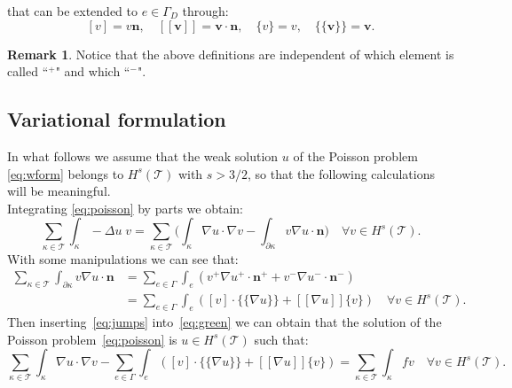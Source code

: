 \documentclass[12pt, a4paper]{article}
\theoremstyle{definition}
\theoremstyle{plain}
\theoremstyle{plain}
\theoremstyle{definition}
\newtheorem*{remark}{Remark}
\begin{document}
that can be extended to $e \in \Gamma_D$ through:
\begin{equation} \label{eq:jupsandaverdir}
	[v] = v \mathbf{n},
	\quad [\![ \mathbf{v} ]\!] = \mathbf{v} \cdot \mathbf{n},
	\quad \{v\} = v,
	\quad \{\!\!\{ \mathbf{v} \}\!\!\} = \mathbf{v}.
\end{equation}
\begin{remark}
	Notice that the above definitions are independent of which element is 
	called ``$^+$" and which ``$^-$".
\end{remark}
\subsection{Variational formulation}
In what follows we assume that the weak solution $u$ of the Poisson problem~ \eqref{eq:wform} belongs to $H^s(\mathcal{T})$ with $s > 3/2$, so that the following calculations will be meaningful.\\
Integrating \eqref{eq:poisson} by parts we obtain:
\begin{equation} \label{eq:green}
	\sum_{\kappa \in \mathcal{T}} \int_\kappa -\Delta u \; v
	= \sum_{\kappa \in \mathcal{T}} \bigg( \int_\kappa \nabla u \cdot \nabla v
	- \int_{\partial \kappa} v \nabla u \cdot \mathbf{n} \bigg) \quad \forall v 
	\in H^s(\mathcal{T}).
\end{equation}
With some manipulations we can see that:
\begin{equation} \label{eq:jumps}
\begin{split}
	\sum_{\kappa \in \mathcal{T}} \int_{\partial \kappa} v \nabla u \cdot \mathbf{n} &= \sum_{e \in \Gamma} \int_e (v^+ \nabla u^+ \cdot \mathbf{n}^+ + v^- \nabla u^- \cdot \mathbf{n}^- )\\
	&= \sum_{e \in \Gamma} \int_e ([v] \cdot \{\!\!\{ \nabla u \}\!\!\} + [\![ 
	\nabla u ]\!] \{v\} ) \quad \forall v \in H^s(\mathcal{T}).
\end{split}
\end{equation}
Then inserting~\eqref{eq:jumps} into~\eqref{eq:green} we can obtain that the solution of the Poisson problem~\eqref{eq:poisson} is $u \in H^s(\mathcal{T})$ such that:
\begin{equation} \label{eq:firstform}
	\sum_{\kappa \in \mathcal{T}} \int_\kappa \nabla u \cdot \nabla v -
	\sum_{e \in \Gamma} \int_e ([v] \cdot \{\!\!\{ \nabla u \}\!\!\} + [\![ \nabla u ]\!] \{v\} ) =
	\sum_{\kappa \in \mathcal{T}} \int_\kappa fv \quad \forall v \in 
	H^s(\mathcal{T}).
\end{equation}
\end{document}
